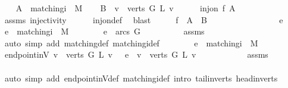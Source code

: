 \begin{isabellebody}
\ \ \isamarkupfalse%
\ {\isacharquery}A\ {\isacharequal}\ {\isachardoublequoteopen}matching{\isacharunderscore}i\ {}\ M{\isachardoublequoteclose}\isanewline
\ \ \isamarkupfalse%
\ {\isacharquery}B\ {\isacharequal}\ {\isachardoublequoteopen}{\isacharbraceleft}v\ {\isasymin}\ verts\ G{\isachardot}\ L\ v\ {\isacharequal}\ {}{\isacharbraceright}{\isachardoublequoteclose}\isanewline
\ \ \isamarkupfalse%
\ {\isachardoublequoteopen}inj{\isacharunderscore}on\ {\isacharquery}f\ {\isacharquery}A{\isachardoublequoteclose}\ \isamarkupfalse%
\ assms\ injectivity\isanewline
\ \ \ \ \isamarkupfalse%
\ inj{\isacharunderscore}on{\isacharunderscore}def\ \isamarkupfalse%
\ blast\isanewline
\ \ \isamarkupfalse%
\ \isamarkupfalse%
\ {\isachardoublequoteopen}{\isacharquery}f\ {\isacharbackquote}\ {\isacharquery}A\ {\isasymsubseteq}\ {\isacharquery}B{\isachardoublequoteclose}\isanewline
\ \ \isamarkupfalse%
\ {\isacharminus}\isanewline
\ \ \ \ \isacommand{{\isacharbraceleft}}\isamarkupfalse%
\isanewline
\ \ \ \ \ \ \isamarkupfalse%
\ e\ \isamarkupfalse%
\ {\isachardoublequoteopen}e\ {\isasymin}\ matching{\isacharunderscore}i\ {}\ M{\isachardoublequoteclose}\isanewline
\ \ \ \ \ \ \isamarkupfalse%
\ {\isachardoublequoteopen}e\ {\isasymin}\ arcs\ G{\isachardoublequoteclose}\isanewline
\ \ \ \ \ \ \ \ \isamarkupfalse%
\ assms\ \isamarkupfalse%
\ {\isacharparenleft}auto\ simp\ add{\isacharcolon}\ matching{\isacharunderscore}def\ matching{\isacharunderscore}i{\isacharunderscore}def{\isacharparenright}\isanewline
\ \ \ \ \ \ \isamarkupfalse%
\ {\isacharbackquoteopen}e\ {\isasymin}\ matching{\isacharunderscore}i\ {}\ M{\isacharbackquoteclose}\isanewline
\ \ \ \ \ \ \isamarkupfalse%
\ {\isachardoublequoteopen}endpoint{\isacharunderscore}inV\ {\isacharbraceleft}v\ {\isasymin}\ verts\ G{\isachardot}\ L\ v\ {\isacharequal}\ {}{\isacharbraceright}\ e\ {\isasymin}\ {\isacharbraceleft}v\ {\isasymin}\ verts\ G{\isachardot}\ L\ v\ {\isacharequal}\ {}{\isacharbraceright}{\isachardoublequoteclose}\isanewline
\ \ \ \ \ \ \ \ \isamarkupfalse%
\ assms\isanewline
\ \ \ \ \ \ \ \ \isamarkupfalse%
\ {\isacharparenleft}auto\ simp\ add{\isacharcolon}\ endpoint{\isacharunderscore}inV{\isacharunderscore}def\ matching{\isacharunderscore}i{\isacharunderscore}def\ intro{\isacharcolon}\ tail{\isacharunderscore}in{\isacharunderscore}verts\ head{\isacharunderscore}in{\isacharunderscore}verts{\isacharparenright}\isanewline

\end{isabellebody}
